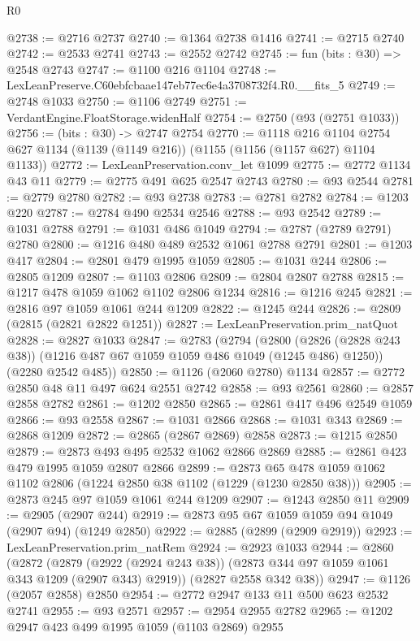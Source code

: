 \begin{lexlean}{R0}
\begin{coremodule}
@2738 := @2716 @2737
@2740 := @1364 @2738 @1416
@2741 := @2715 @2740
@2742 := @2533 @2741
@2743 := @2552 @2742
@2745 := fun (bits : @30) => @2548 @2743
@2747 := @1100 @216 @1104
@2748 := LexLeanPreserve.C60ebfcbaae147eb77ec6e4a3708732f4.R0.__fits_5
@2749 := @2748 @1033
@2750 := @1106 @2749
@2751 := VerdantEngine.FloatStorage.widenHalf
@2754 := @2750 (@93 (@2751 @1033))
@2756 := (bits : @30) -> @2747 @2754
@2770 := @1118
    @216
    @1104
    @2754
    @627
    @1134
    (@1139 (@1149 @216))
    (@1155 (@1156 (@1157 @627) @1104 @1133))
@2772 := LexLeanPreservation.conv_let @1099
@2775 := @2772 @1134 @43 @11
@2779 := @2775 @491 @625 @2547 @2743
@2780 := @93 @2544
@2781 := @2779 @2780
@2782 := @93 @2738
@2783 := @2781 @2782
@2784 := @1203 @220
@2787 := @2784 @490 @2534 @2546
@2788 := @93 @2542
@2789 := @1031 @2788
@2791 := @1031 @486 @1049
@2794 := @2787 (@2789 @2791) @2780
@2800 := @1216 @480 @489 @2532 @1061 @2788 @2791
@2801 := @1203 @417
@2804 := @2801 @479 @1995 @1059
@2805 := @1031 @244
@2806 := @2805 @1209
@2807 := @1103 @2806
@2809 := @2804 @2807 @2788
@2815 := @1217 @478 @1059 @1062 @1102 @2806 @1234
@2816 := @1216 @245
@2821 := @2816 @97 @1059 @1061 @244 @1209
@2822 := @1245 @244
@2826 := @2809 (@2815 (@2821 @2822 @1251))
@2827 := LexLeanPreservation.prim_natQuot
@2828 := @2827 @1033
@2847 := @2783
    (@2794
      (@2800 (@2826 (@2828 @243 @38)) (@1216 @487 @67 @1059 @1059 @486 @1049 (@1245 @486) @1250))
      (@2280 @2542 @485))
@2850 := @1126 (@2060 @2780) @1134
@2857 := @2772 @2850 @48 @11 @497 @624 @2551 @2742
@2858 := @93 @2561
@2860 := @2857 @2858 @2782
@2861 := @1202 @2850
@2865 := @2861 @417 @496 @2549 @1059
@2866 := @93 @2558
@2867 := @1031 @2866
@2868 := @1031 @343
@2869 := @2868 @1209
@2872 := @2865 (@2867 @2869) @2858
@2873 := @1215 @2850
@2879 := @2873 @493 @495 @2532 @1062 @2866 @2869
@2885 := @2861 @423 @479 @1995 @1059 @2807 @2866
@2899 := @2873 @65 @478 @1059 @1062 @1102 @2806 (@1224 @2850 @38 @1102 (@1229 (@1230 @2850 @38)))
@2905 := @2873 @245 @97 @1059 @1061 @244 @1209
@2907 := @1243 @2850 @11
@2909 := @2905 (@2907 @244)
@2919 := @2873 @95 @67 @1059 @1059 @94 @1049 (@2907 @94) (@1249 @2850)
@2922 := @2885 (@2899 (@2909 @2919))
@2923 := LexLeanPreservation.prim_natRem
@2924 := @2923 @1033
@2944 := @2860
    (@2872
      (@2879 (@2922 (@2924 @243 @38)) (@2873 @344 @97 @1059 @1061 @343 @1209 (@2907 @343) @2919))
      (@2827 @2558 @342 @38))
@2947 := @1126 (@2057 @2858) @2850
@2954 := @2772 @2947 @133 @11 @500 @623 @2532 @2741
@2955 := @93 @2571
@2957 := @2954 @2955 @2782
@2965 := @1202 @2947 @423 @499 @1995 @1059 (@1103 @2869) @2955

\end{coremodule}
\end{lexlean}
